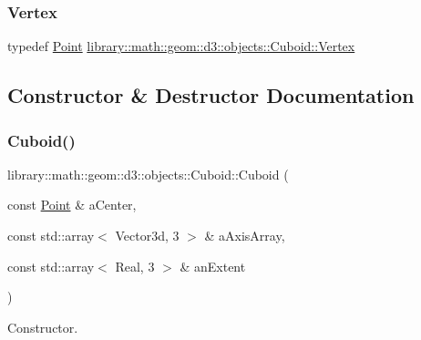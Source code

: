 \mbox{\label{classlibrary_1_1math_1_1geom_1_1d3_1_1objects_1_1_cuboid_ad9600791c8ac7f1253dc94417ec12f3c}} 
\subsubsection{\texorpdfstring{Vertex}{Vertex}}
{\footnotesize\ttfamily typedef \hyperlink{classlibrary_1_1math_1_1geom_1_1d3_1_1objects_1_1_point}{Point} \hyperlink{classlibrary_1_1math_1_1geom_1_1d3_1_1objects_1_1_cuboid_ad9600791c8ac7f1253dc94417ec12f3c}{library\+::math\+::geom\+::d3\+::objects\+::\+Cuboid\+::\+Vertex}}



\subsection{Constructor \& Destructor Documentation}
\mbox{\label{classlibrary_1_1math_1_1geom_1_1d3_1_1objects_1_1_cuboid_ac42299f962fab284a76a46d4ea4e6fa2}} 
\subsubsection{\texorpdfstring{Cuboid()}{Cuboid()}}
{\footnotesize\ttfamily library\+::math\+::geom\+::d3\+::objects\+::\+Cuboid\+::\+Cuboid (\begin{DoxyParamCaption}\item[{const \hyperlink{classlibrary_1_1math_1_1geom_1_1d3_1_1objects_1_1_point}{Point} \&}]{a\+Center,  }\item[{const std\+::array$<$ Vector3d, 3 $>$ \&}]{a\+Axis\+Array,  }\item[{const std\+::array$<$ Real, 3 $>$ \&}]{an\+Extent }\end{DoxyParamCaption})}



Constructor. 


